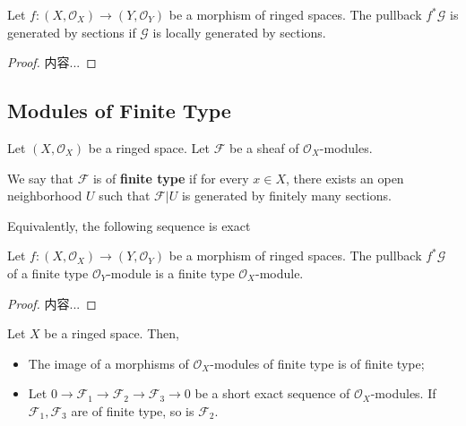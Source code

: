 \documentclass[Total.tex]{subfiles}
\begin{document}
			\begin{lemma}
				Let $f:(X,\mathcal{O}_X)\rightarrow (Y,\mathcal{O}_Y)$ be a morphism of ringed spaces. The pullback $f^*\mathcal{G}$ is generated by sections if $\mathcal{G}$ is locally generated by sections.
			\end{lemma}
			\begin{proof}
				内容...
			\end{proof}
			
			
			\subsection{Modules of Finite Type}
				
				\begin{Def}
					Let $(X,\mathcal{O}_X)$ be a ringed space. Let $\mathcal{F}$ be a sheaf of $\mathcal{O}_X$-modules.
					
					We say that $\mathcal{F}$ is of \textbf{finite type} if for every $x\in X$, there exists an open neighborhood $U$ such that $\mathcal{F}|U$ is generated by finitely many sections.
				\end{Def}
				
				Equivalently, the following sequence is exact
				
				\begin{center}
				\end{center}
				
				\begin{lemma}
					Let $f:(X,\mathcal{O}_X)\rightarrow (Y,\mathcal{O}_Y)$ be a morphism of ringed spaces. The pullback $f^*\mathcal{G}$ of a finite type $\mathcal{O}_Y$-module is a finite type $\mathcal{O}_X$-module.
				\end{lemma}
				
				\begin{proof}
					内容...
				\end{proof}
				
				\begin{lemma}
					Let $X$ be a ringed space. Then, 
					
					\begin{itemize}
						\item The image of a morphisms of $\mathcal{O}_X$-modules of finite type is of finite type;
						
						\item Let $0\rightarrow \mathcal{F}_1\rightarrow \mathcal{F}_2\rightarrow \mathcal{F}_3\rightarrow 0$ be a short exact sequence of $\mathcal{O}_X$-modules. If $\mathcal{F}_1,\mathcal{F}_3$ are of finite type, so is $\mathcal{F}_2$.
					\end{itemize}
				\end{lemma}
				
\end{document}
